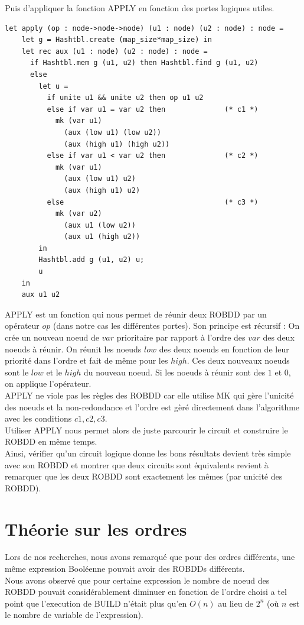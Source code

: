 \documentclass[a4paper, oneside]{report}
\begin{document}
Puis d'appliquer la fonction APPLY en fonction des portes logiques utiles.\\
\newpage
\begin{lstlisting}
let apply (op : node->node->node) (u1 : node) (u2 : node) : node =
    let g = Hashtbl.create (map_size*map_size) in
    let rec aux (u1 : node) (u2 : node) : node =
      if Hashtbl.mem g (u1, u2) then Hashtbl.find g (u1, u2)
      else
        let u =
          if unite u1 && unite u2 then op u1 u2
          else if var u1 = var u2 then              (* c1 *) 
            mk (var u1)
              (aux (low u1) (low u2)) 
              (aux (high u1) (high u2))
          else if var u1 < var u2 then              (* c2 *) 
            mk (var u1)
              (aux (low u1) u2) 
              (aux (high u1) u2)
          else                                      (* c3 *)
            mk (var u2)
              (aux u1 (low u2)) 
              (aux u1 (high u2))
        in 
        Hashtbl.add g (u1, u2) u;
        u
    in
    aux u1 u2
\end{lstlisting}

APPLY est un fonction qui nous permet de réunir deux ROBDD par un opérateur $op$ (dans notre cas les différentes portes). Son principe est récursif : On crée un nouveau noeud de $var$ prioritaire par rapport à l'ordre des $var$ des deux noeuds à réunir. On réunit les noeuds $low$ des deux noeuds en fonction de leur priorité dans l'ordre et fait de même pour les $high$. Ces deux nouveaux noeuds sont le $low$ et le $high$ du nouveau noeud. Si les noeuds à réunir sont des $1$ et $0$, on applique l'opérateur.\\

APPLY ne viole pas les règles des ROBDD car elle utilise MK qui gère l'unicité des noeuds et la non-redondance et l'ordre est gèré directement dans l'algorithme avec les conditions $c1, c2, c3$.\\

Utiliser APPLY nous permet alors de juste parcourir le circuit et construire le ROBDD en même temps.\\


Ainsi, vérifier qu'un circuit logique donne les bons résultats devient très simple avec son ROBDD et montrer que deux circuits sont équivalents revient à remarquer que les deux ROBDD sont exactement les mêmes (par unicité des ROBDD).


\newpage

\section{Théorie sur les ordres}
\label{order}
Lors de nos recherches, nous avons remarqué que pour des ordres différents, une même expression Booléenne pouvait avoir des ROBDDs différents.\\
Nous avons observé que pour certaine expression le nombre de noeud des ROBDD pouvait considérablement diminuer en fonction de l'ordre choisi a tel point que l'execution de BUILD n'était plus qu'en $O(n)$ au lieu de $2^n$ (où $n$ est le nombre de variable de l'expression).\\
\end{document}
